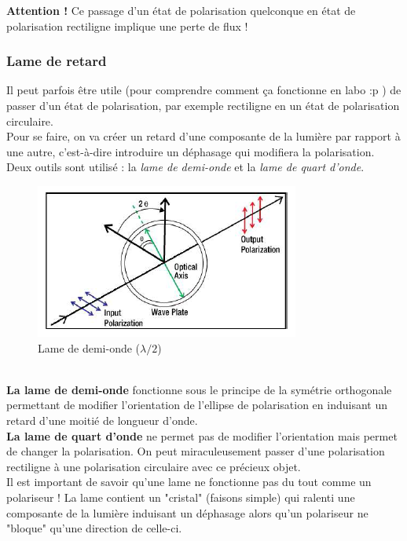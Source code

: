 \documentclass	[11pt, a4paper, openany]{book}
\begin{document}
		\textbf{Attention !} Ce passage d'un état de polarisation quelconque en état de polarisation rectiligne implique une perte de flux !
		
		\subsubsection*{Lame de retard}
		Il peut parfois être utile (pour comprendre comment ça fonctionne en labo :p ) de passer d'un état de polarisation, par exemple rectiligne en un état de polarisation circulaire.\\
		Pour se faire, on va créer un retard d'une composante de la lumière par rapport à une autre, c'est-à-dire introduire un déphasage qui modifiera la polarisation. Deux outils sont utilisé : la \textit{lame de demi-onde} et la \textit{lame de quart d'onde}.
		\begin{figure}[h]
			\begin{center}
				\includegraphics[scale=0.5]{labo/image4.png}
			\end{center}
			\caption{Lame de demi-onde ($\lambda/2$)}
			\label{lamedemo}
		\end{figure}\  \\
		
		\textbf{La lame de demi-onde} fonctionne sous le principe de la symétrie orthogonale permettant de modifier l'orientation de l'ellipse de polarisation en induisant un retard d'une moitié de longueur d'onde.\\
		
		\textbf{La lame de quart d'onde} ne permet pas de modifier l'orientation mais permet de changer la polarisation. On peut miraculeusement passer d'une polarisation rectiligne à une polarisation circulaire avec ce précieux objet.\\
		
		Il est important de savoir qu'une lame ne fonctionne pas du tout comme un polariseur ! La lame contient un "cristal" (faisons simple) qui ralenti une composante de la lumière induisant un déphasage alors qu'un polariseur ne "bloque" qu'une direction de celle-ci.
		
\end{document}
